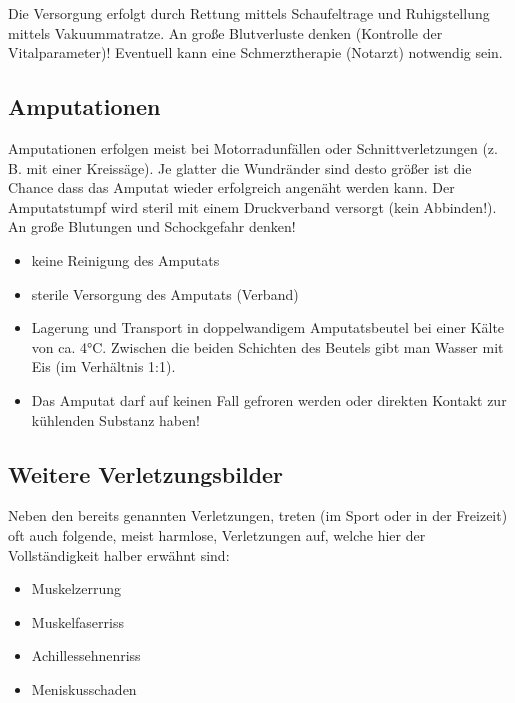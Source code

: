 Die Versorgung erfolgt durch Rettung mittels Schaufeltrage und Ruhigstellung
mittels Vakuummatratze. An große Blutverluste denken (Kontrolle der
Vitalparameter)! Eventuell kann eine Schmerztherapie (Notarzt) notwendig sein.

\subsection{Amputationen}


Amputationen erfolgen meist bei Motorradunfällen oder Schnittverletzungen (z.\,B.
mit einer Kreissäge). Je glatter die Wundränder sind desto größer ist die Chance
dass das Amputat wieder erfolgreich angenäht werden kann. Der Amputatstumpf wird
steril mit einem Druckverband versorgt (kein Abbinden!). An große Blutungen und
Schockgefahr denken!

{
\begin{itemize}
  \item keine Reinigung des Amputats
  \item sterile Versorgung des Amputats (Verband)
  \item Lagerung und Transport in doppelwandigem Amputatsbeutel bei  einer
  Kälte von ca. 4°C. Zwischen die beiden Schichten des Beutels gibt  man Wasser
  mit Eis (im Verhältnis 1:1).
  \item Das Amputat darf auf keinen Fall gefroren werden oder  direkten Kontakt
  zur kühlenden Substanz haben!
\end{itemize}
}

\subsection{Weitere Verletzungsbilder}

Neben den bereits genannten Verletzungen, treten (im Sport oder in der Freizeit)
oft auch folgende, meist harmlose, Verletzungen auf, welche hier der
Vollständigkeit halber erwähnt sind:

\begin{itemize}
     \item Muskelzerrung
     \item Muskelfaserriss
     \item Achillessehnenriss
     \item Meniskusschaden
\end{itemize}

